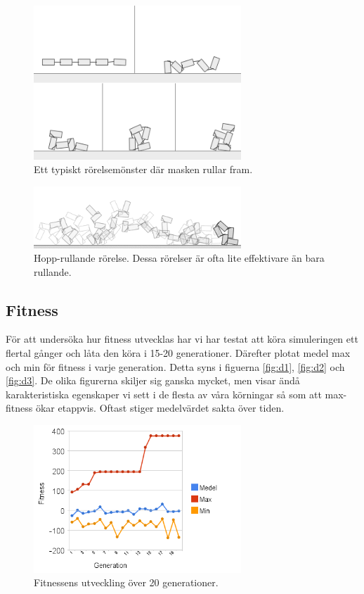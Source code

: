 \documentclass[titlepage, twocolumn, a4paper, 12pt, swedish]{article}
\begin{document}
\begin{figure}
    \includegraphics[width=78mm]{images/mask1_gs.png}
    \caption{Ett typiskt rörelsemönster där masken rullar fram.}
    \label{fig:r1}
\end{figure}

\begin{figure}
    \includegraphics[width=78mm]{images/maskninja.png}
    \caption{Hopp-rullande rörelse. Dessa rörelser är ofta lite effektivare än bara rullande.}
    \label{fig:r2}
\end{figure}

\subsection{Fitness}
För att undersöka hur fitness utvecklas har vi har testat att köra simuleringen ett flertal gånger och låta den köra i 15-20 generationer. Därefter plotat medel max och min för fitness i varje generation. Detta syns i figuerna \vref{fig:d1}, \vref{fig:d2} och \vref{fig:d3}. De olika figurerna skiljer sig ganska mycket, men visar ändå karakteristiska egenskaper vi sett i de flesta av våra körningar så som att max-fitness ökar etappvis. Oftast stiger medelvärdet sakta över tiden.

\begin{figure}
    \includegraphics[width=78mm]{images/diagram4.png}
    \caption{Fitnessens utveckling över 20 generationer.}
    \label{fig:d1}
\end{figure}
\end{document}
